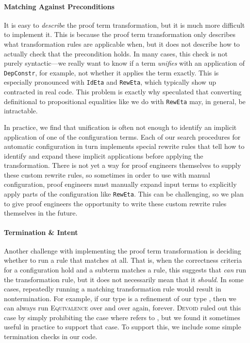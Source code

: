 \paragraph{Matching Against Preconditions}

It is easy to \textit{describe} the proof term transformation, but it is much more difficult to implement it.
This is because the proof term transformation only describes what transformation rules are applicable when,
but it does not describe how to actually check that the precondition holds.
In many cases, this check is not purely syntactic---we really want to know if a term \textit{unifies}
with an application of \lstinline{DepConstr}, for example, not whether it applies the term exactly.
This is especially pronounced with \lstinline{IdEta} and \lstinline{RewEta},
which typically show up contracted in real code.
This problem is exactly why \citet{tabareau2019marriage} speculated that converting definitional to propositional equalities
like we do with \lstinline{RewEta} may, in general, be intractable.

In practice, we find that unification is often not enough to identify an implicit application of one of the configuration terms.
Each of our search procedures for automatic configuration in turn implements special rewrite rules that tell \toolname
how to identify and expand these implicit applications before applying the transformation.
There is not yet a way for proof engineers themselves to supply these custom rewrite rules,
so sometimes in order to use \toolname with manual configuration, proof engineers must manually expand
input terms to explicitly apply parts of the configuration like \lstinline{RewEta}.
This can be challenging, so we plan to give proof engineers the opportunity to write
these custom rewrite rules themselves in the future.

\paragraph{Termination \& Intent}

Another challenge with implementing the proof term transformation is deciding whether to run a rule that matches at all.
That is, when the correctness criteria for a configuration hold and a subterm matches a rule, this suggests that \toolname \textit{can}
run the transformation rule, but it does not necessarily mean that it \textit{should}.
In some cases, repeatedly running a matching transformation rule would result in nontermination.
For example, if our type \B is a refinement of our type \A, then we can always run \textsc{Equivalence}
over and over again, forever.
\textsc{Devoid} ruled out this case by simply prohibiting the case where \B refers to \A, but we found it sometimes
useful in practice to support that case.
To support this, we include some simple termination checks in our code.

